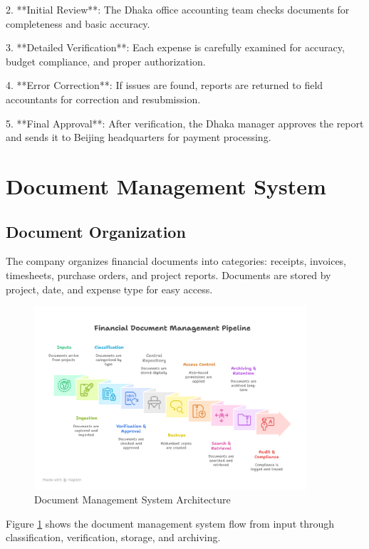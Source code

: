 2. **Initial Review**: The Dhaka office accounting team checks documents for completeness and basic accuracy.

3. **Detailed Verification**: Each expense is carefully examined for accuracy, budget compliance, and proper authorization.

4. **Error Correction**: If issues are found, reports are returned to field accountants for correction and resubmission.

5. **Final Approval**: After verification, the Dhaka manager approves the report and sends it to Beijing headquarters for payment processing.

\vspace{0.5em}
\section{Document Management System}

\subsection{Document Organization}
The company organizes financial documents into categories: receipts, invoices, timesheets, purchase orders, and project reports. Documents are stored by project, date, and expense type for easy access.

\begin{figure}[H]
    \centering
    \includegraphics[width=0.9\textwidth]{assets/images/document_management.png}
    \caption{Document Management System Architecture}
    \label{fig:document_management}
\end{figure}

Figure \ref{fig:document_management} shows the document management system flow from input through classification, verification, storage, and archiving.

